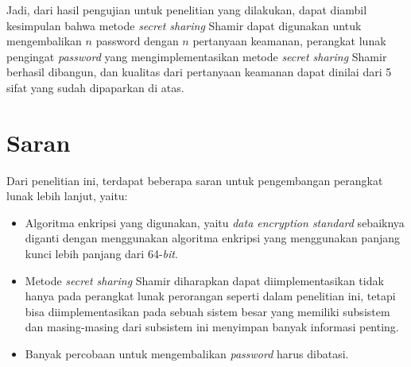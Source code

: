 Jadi, dari hasil pengujian untuk penelitian yang dilakukan, dapat diambil kesimpulan bahwa metode \textit{secret sharing} Shamir dapat digunakan untuk mengembalikan $n$ password dengan $n$ pertanyaan keamanan, perangkat lunak pengingat \textit{password} yang mengimplementasikan metode \textit{secret sharing} Shamir berhasil dibangun, dan kualitas dari pertanyaan keamanan dapat dinilai dari 5 sifat yang sudah dipaparkan di atas.

\section{Saran}

Dari penelitian ini, terdapat beberapa saran untuk pengembangan perangkat lunak lebih lanjut, yaitu:
\begin{itemize}[itemsep=0mm]
	\item Algoritma enkripsi yang digunakan, yaitu \textit{data encryption standard} sebaiknya diganti dengan menggunakan algoritma enkripsi yang menggunakan panjang kunci lebih panjang dari 64-\textit{bit}.
	\item Metode \textit{secret sharing} Shamir diharapkan dapat diimplementasikan tidak hanya pada perangkat lunak perorangan seperti dalam penelitian ini, tetapi bisa diimplementasikan pada sebuah sistem besar yang memiliki subsistem dan masing-masing dari subsistem ini menyimpan banyak informasi penting.
	\item Banyak percobaan untuk mengembalikan \textit{password} harus dibatasi.
\end{itemize}